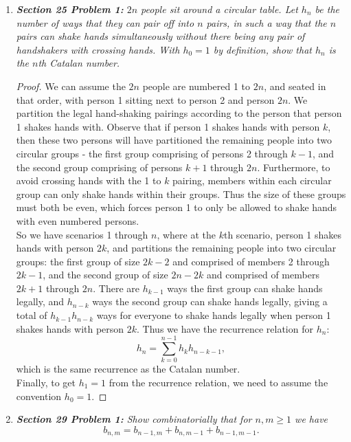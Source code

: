 \documentclass{article}
\begin{document}
\begin{enumerate}[label={\bf Q\arabic*:}]
  \item \it \textbf{Section 25 Problem 1:} $2n$ people sit around a
    circular table. Let $h_n$ be the number of ways that they can pair off
    into $n$ pairs, in such a way that the $n$ pairs can shake hands
    simultaneously without there being any pair of handshakers with
    crossing hands. With $h_0=1$ by definition, show that $h_n$ is the
    $n$th Catalan number.

    \begin{proof}
      We can assume the $2n$ people are numbered 1 to $2n$, and seated in
      that order, with person 1 sitting next to person 2 and person $2n$.
      We partition the legal hand-shaking pairings according to the person
      that person 1 shakes hands with. Observe that if person 1 shakes
      hands with person $k$, then these two persons will have partitioned
      the remaining people into two circular groups - the first group
      comprising of persons 2 through $k-1$, and the second group
      comprising of persons $k+1$ through $2n$. Furthermore, to avoid
      crossing hands with the 1 to $k$ pairing, members within each
      circular group can only shake hands within their groups. Thus the
      size of these groups must both be even, which forces person 1 to
      only be allowed to shake hands with even numbered persons. \\

      So we have scenarios 1 through $n$, where at the $k$th scenario,
      person 1 shakes hands with person $2k$, and partitions the remaining
      people into two circular groups: the first group of size $2k-2$ and
      comprised of members 2 through $2k-1$, and the second group of size
      $2n-2k$ and comprised of members $2k+1$ through $2n$.
      There are $h_{k-1}$ ways the first group can shake hands legally, and
      $h_{n-k}$ ways the second group can shake hands legally, giving a
      total of $h_{k-1}h_{n-k}$ ways for everyone to shake hands legally
      when person 1 shakes hands with person $2k$. Thus we have the
      recurrence relation for $h_n$:
      \[h_n =\sum_{k=0}^{n-1} h_kh_{n-k-1},\]
      which is the same recurrence as the Catalan number. \\

      Finally, to get $h_1=1$ from the recurrence relation, we need to
      assume the convention $h_0=1$.
    \end{proof}

  \item \it \textbf{Section 29 Problem 1:} Show combinatorially that for
    $n,m\geq1$ we have
    \[b_{n,m} =b_{n-1,m} +b_{n,m-1} +b_{n-1,m-1}.\]


\end{enumerate}
\end{document}
